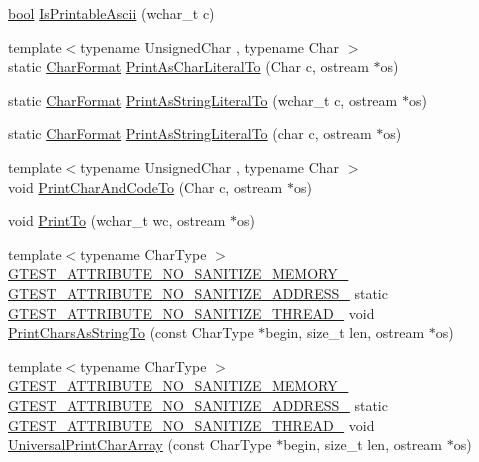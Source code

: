 \begin{DoxyCompactItemize}
\item 
\hyperlink{classbool}{bool} \hyperlink{namespacetesting_1_1internal_a744a6dd74c12d1e2c16b3c03e14ed4d4}{Is\+Printable\+Ascii} (wchar\+\_\+t c)
\item 
{\footnotesize template$<$typename Unsigned\+Char , typename Char $>$ }\\static \hyperlink{namespacetesting_1_1internal_ae2ef98247c76a50cdc80ceb4a6c81793}{Char\+Format} \hyperlink{namespacetesting_1_1internal_ab73d250fde6dfbf16111afb7a071dc3f}{Print\+As\+Char\+Literal\+To} (Char c, ostream $\ast$os)
\item 
static \hyperlink{namespacetesting_1_1internal_ae2ef98247c76a50cdc80ceb4a6c81793}{Char\+Format} \hyperlink{namespacetesting_1_1internal_a8c5838995d7bb9e4232b69e6bcdb9ab8}{Print\+As\+String\+Literal\+To} (wchar\+\_\+t c, ostream $\ast$os)
\item 
static \hyperlink{namespacetesting_1_1internal_ae2ef98247c76a50cdc80ceb4a6c81793}{Char\+Format} \hyperlink{namespacetesting_1_1internal_a82e5b3cf45fd9c4603dbe14bc4cb38c2}{Print\+As\+String\+Literal\+To} (char c, ostream $\ast$os)
\item 
{\footnotesize template$<$typename Unsigned\+Char , typename Char $>$ }\\void \hyperlink{namespacetesting_1_1internal_a0c577e598e61d339ba45dd6643fb1969}{Print\+Char\+And\+Code\+To} (Char c, ostream $\ast$os)
\item 
void \hyperlink{namespacetesting_1_1internal_aa74ea9d64f76ce69eceb225ca5ebef58}{Print\+To} (wchar\+\_\+t wc, ostream $\ast$os)
\item 
{\footnotesize template$<$typename Char\+Type $>$ }\\\hyperlink{gtest-port_8h_a2a83dd79037e53814a509cc3f5702650}{G\+T\+E\+S\+T\+\_\+\+A\+T\+T\+R\+I\+B\+U\+T\+E\+\_\+\+N\+O\+\_\+\+S\+A\+N\+I\+T\+I\+Z\+E\+\_\+\+M\+E\+M\+O\+R\+Y\+\_\+} \hyperlink{gtest-port_8h_af18b465f4ba6e36eea7a8d2d79521873}{G\+T\+E\+S\+T\+\_\+\+A\+T\+T\+R\+I\+B\+U\+T\+E\+\_\+\+N\+O\+\_\+\+S\+A\+N\+I\+T\+I\+Z\+E\+\_\+\+A\+D\+D\+R\+E\+S\+S\+\_\+} static \hyperlink{gtest-port_8h_abf30a6b1b3a12ecb2cc1bc1a6f5f9646}{G\+T\+E\+S\+T\+\_\+\+A\+T\+T\+R\+I\+B\+U\+T\+E\+\_\+\+N\+O\+\_\+\+S\+A\+N\+I\+T\+I\+Z\+E\+\_\+\+T\+H\+R\+E\+A\+D\+\_\+} void \hyperlink{namespacetesting_1_1internal_a0be71e6d7cb274131c559193f81c83e2}{Print\+Chars\+As\+String\+To} (const Char\+Type $\ast$begin, size\+\_\+t len, ostream $\ast$os)
\item 
{\footnotesize template$<$typename Char\+Type $>$ }\\\hyperlink{gtest-port_8h_a2a83dd79037e53814a509cc3f5702650}{G\+T\+E\+S\+T\+\_\+\+A\+T\+T\+R\+I\+B\+U\+T\+E\+\_\+\+N\+O\+\_\+\+S\+A\+N\+I\+T\+I\+Z\+E\+\_\+\+M\+E\+M\+O\+R\+Y\+\_\+} \hyperlink{gtest-port_8h_af18b465f4ba6e36eea7a8d2d79521873}{G\+T\+E\+S\+T\+\_\+\+A\+T\+T\+R\+I\+B\+U\+T\+E\+\_\+\+N\+O\+\_\+\+S\+A\+N\+I\+T\+I\+Z\+E\+\_\+\+A\+D\+D\+R\+E\+S\+S\+\_\+} static \hyperlink{gtest-port_8h_abf30a6b1b3a12ecb2cc1bc1a6f5f9646}{G\+T\+E\+S\+T\+\_\+\+A\+T\+T\+R\+I\+B\+U\+T\+E\+\_\+\+N\+O\+\_\+\+S\+A\+N\+I\+T\+I\+Z\+E\+\_\+\+T\+H\+R\+E\+A\+D\+\_\+} void \hyperlink{namespacetesting_1_1internal_ad896a4e4d9133ce43dc18b6038d95dc3}{Universal\+Print\+Char\+Array} (const Char\+Type $\ast$begin, size\+\_\+t len, ostream $\ast$os)

\end{DoxyCompactItemize}

